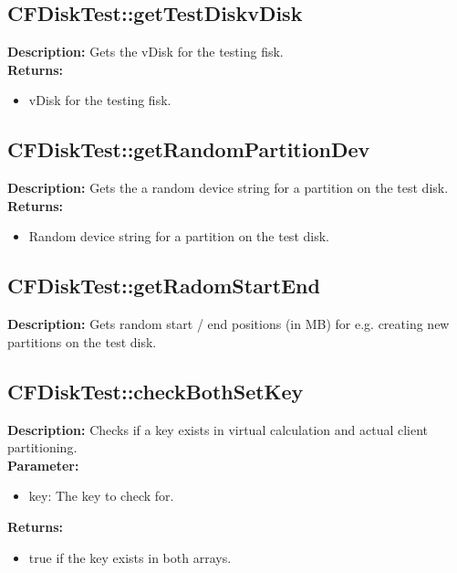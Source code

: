 \subsection{CFDiskTest::getTestDiskvDisk}
\textbf{Description:} Gets the vDisk for the testing fisk.\\
\textbf{Returns:}
\begin{itemize}
\item vDisk for the testing fisk.
\end{itemize}

\subsection{CFDiskTest::getRandomPartitionDev}
\textbf{Description:} Gets the a random device string for a partition on the test disk.\\
\textbf{Returns:}
\begin{itemize}
\item Random device string for a partition on the test disk.
\end{itemize}

\subsection{CFDiskTest::getRadomStartEnd}
\textbf{Description:} Gets random start / end positions (in MB) for e.g. creating new partitions on the test disk.\\

\subsection{CFDiskTest::checkBothSetKey}
\textbf{Description:} Checks if a key exists in virtual calculation and actual client partitioning.\\
\textbf{Parameter:}
\begin{itemize}
\item key: The key to check for.
\end{itemize}
\textbf{Returns:}
\begin{itemize}
\item true if the key exists in both arrays.
\end{itemize}

